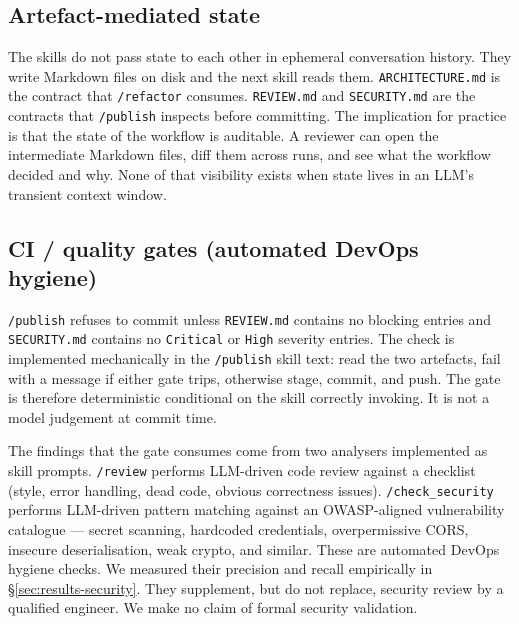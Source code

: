 \documentclass[journal]{IEEEtran}
\begin{document}
\subsection{Artefact-mediated state}

The skills do not pass state to each other in ephemeral
conversation history. They write Markdown files on disk and the
next skill reads them. \texttt{ARCHITECTURE.md} is the contract
that \texttt{/refactor} consumes. \texttt{REVIEW.md} and
\texttt{SECURITY.md} are the contracts that \texttt{/publish}
inspects before committing. The implication for practice is that
the state of the workflow is auditable. A reviewer can open the
intermediate Markdown files, diff them across runs, and see what
the workflow decided and why. None of that visibility exists when
state lives in an LLM's transient context window.

\subsection{CI / quality gates (automated DevOps hygiene)}

\texttt{/publish} refuses to commit unless \texttt{REVIEW.md}
contains no blocking entries and \texttt{SECURITY.md} contains no
\texttt{Critical} or \texttt{High} severity entries. The check is
implemented mechanically in the \texttt{/publish} skill text: read
the two artefacts, fail with a message if either gate trips,
otherwise stage, commit, and push. The gate is therefore
deterministic conditional on the skill correctly invoking. It is
not a model judgement at commit time.

The findings that the gate consumes come from two analysers
implemented as skill prompts. \texttt{/review} performs LLM-driven
code review against a checklist (style, error handling, dead code,
obvious correctness issues). \texttt{/check\_security} performs
LLM-driven pattern matching against an OWASP-aligned vulnerability
catalogue --- secret scanning, hardcoded credentials,
overpermissive CORS, insecure deserialisation, weak crypto, and
similar. These are automated DevOps hygiene checks. We measured
their precision and recall empirically in
\S\ref{sec:results-security}. They supplement, but do not replace,
security review by a qualified engineer. We make no claim of
formal security validation.
\end{document}
